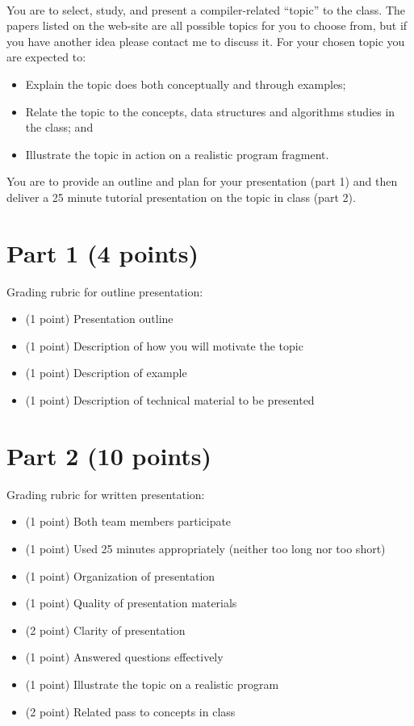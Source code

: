 \documentclass[12pt,letterpaper]{article}
\begin{document}
~

You are to select, study, and present a compiler-related ``topic'' to the class.
The papers listed on the web-site are all possible topics for you to
choose from, but if you have another idea please contact me to discuss it.
For your chosen topic you are expected to:
\begin{itemize}
\item Explain the topic does both conceptually and through examples;
\item Relate the topic to the concepts, data structures and algorithms studies in the class; and
\item Illustrate the topic in action on a realistic program fragment.
\end{itemize}
You are to provide an outline and plan for your presentation (part 1) and
then deliver a 25 minute tutorial presentation on the topic in class (part 2).


\section*{Part 1 (4 points)}
Grading rubric for outline presentation:
\begin{itemize}
\item (1 point) Presentation outline
\item (1 point) Description of how you will motivate the topic
\item (1 point) Description of example
\item (1 point) Description of technical material to be presented
\end{itemize}

\section*{Part 2 (10 points)}
Grading rubric for written presentation:
\begin{itemize}
\item (1 point) Both team members participate
\item (1 point) Used 25 minutes appropriately (neither too long nor too short)
\item (1 point) Organization of presentation
\item (1 point) Quality of presentation materials
\item (2 point) Clarity of presentation 
\item (1 point) Answered questions effectively
\item (1 point) Illustrate the topic on a realistic program
\item (2 point) Related pass to concepts in class
\end{itemize}
\end{document}
